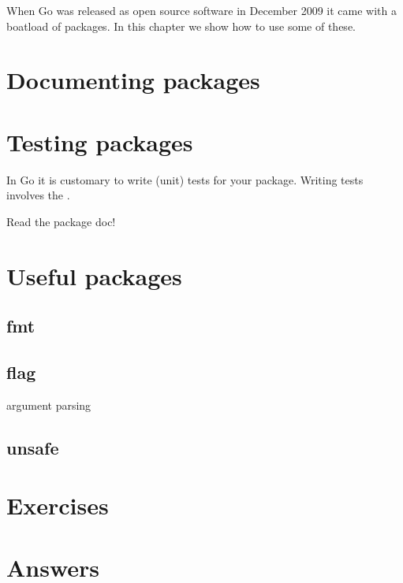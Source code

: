 \noindent

When Go was released as open source software in December 2009 it came
with a boatload of packages. In this chapter we show how to use some
of these.


\section{Documenting packages}





\section{Testing packages}
In Go it is customary to write (unit) tests for your package. Writing
tests involves the .
\begin{lbar}
Read the package doc!
\end{lbar}



\section{Useful packages}



\subsection{fmt}

\subsection{flag}
argument parsing

\subsection{unsafe}


\section{Exercises}

\cleardoublepage
\section{Answers}
\shipoutAnswer
